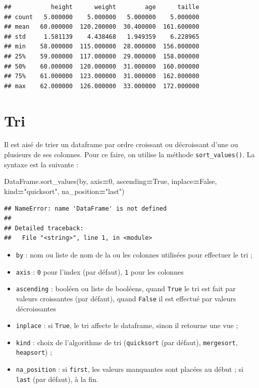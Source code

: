\documentclass[12pt,]{book}
\newenvironment{Shaded}{\begin{snugshade}}{\end{snugshade}}
\newcommand{\DecValTok}[1]{\textcolor[rgb]{0.00,0.00,0.81}{#1}}
\newcommand{\StringTok}[1]{\textcolor[rgb]{0.31,0.60,0.02}{#1}}
\newcommand{\VariableTok}[1]{\textcolor[rgb]{0.00,0.00,0.00}{#1}}
\newcommand{\OperatorTok}[1]{\textcolor[rgb]{0.81,0.36,0.00}{\textbf{#1}}}
\newcommand{\NormalTok}[1]{#1}
\providecommand{\tightlist}{%
  \setlength{\itemsep}{0pt}\setlength{\parskip}{0pt}}
\numberwithin{equation}{section}
\numberwithin{countremarque}{section}
\begin{document}
\begin{lstlisting}
##           height      weight        age      taille
## count   5.000000    5.000000   5.000000    5.000000
## mean   60.000000  120.200000  30.400000  161.600000
## std     1.581139    4.438468   1.949359    6.228965
## min    58.000000  115.000000  28.000000  156.000000
## 25%    59.000000  117.000000  29.000000  158.000000
## 50%    60.000000  120.000000  31.000000  160.000000
## 75%    61.000000  123.000000  31.000000  162.000000
## max    62.000000  126.000000  33.000000  172.000000
\end{lstlisting}

\section{Tri}\label{tri-2}

Il est aisé de trier un dataframe par ordre croissant ou décroissant
d'une ou plusieurs de ses colonnes. Pour ce faire, on utilise la méthode
\texttt{sort\_values()}. La syntaxe est la suivante :

\begin{Shaded}
\begin{Highlighting}[]
\NormalTok{DataFrame.sort_values(by, axis}\OperatorTok{=}\DecValTok{0}\NormalTok{, ascending}\OperatorTok{=}\VariableTok{True}\NormalTok{,}
\NormalTok{                      inplace}\OperatorTok{=}\VariableTok{False}\NormalTok{, kind}\OperatorTok{=}\StringTok{"quicksort"}\NormalTok{,}
\NormalTok{                      na_position}\OperatorTok{=}\StringTok{"last"}\NormalTok{)}
\end{Highlighting}
\end{Shaded}

\begin{lstlisting}
## NameError: name 'DataFrame' is not defined
## 
## Detailed traceback: 
##   File "<string>", line 1, in <module>
\end{lstlisting}

\begin{itemize}
\tightlist
\item
  \texttt{by} : nom ou liste de nom de la ou les colonnes utilisées pour
  effectuer le tri ;
\item
  \texttt{axis} : \texttt{0} pour l'index (par défaut), \texttt{1} pour
  les colonnes
\item
  \texttt{ascending} : booléen ou liste de booléens, quand \texttt{True}
  le tri est fait par valeurs croissantes (par défaut), quand
  \texttt{False} il est effectué par valeurs décroissantes
\item
  \texttt{inplace} : si \texttt{True}, le tri affecte le dataframe,
  sinon il retourne une vue ;
\item
  \texttt{kind} : choix de l'algorithme de tri (\texttt{quicksort} (par
  défaut), \texttt{mergesort}, \texttt{heapsort}) ;
\item
  \texttt{na\_position} : si \texttt{first}, les valeurs manquantes sont
  placées au début ; si \texttt{last} (par défaut), à la fin.
\end{itemize}
\end{document}
